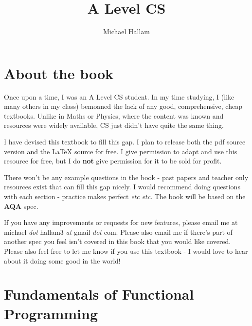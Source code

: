 \documentclass{article}
\title{A Level CS}
\author{Michael Hallam}
\begin{document}
	\maketitle
	\newpage

	\section{About the book}
	Once upon a time, I was an A Level CS student. In my time studying, I (like many others in my class) bemoaned the lack of any good, comprehensive, cheap textbooks. Unlike in Maths or Physics, where the content was known and resources were widely available, CS just didn't have quite the same thing.

	I have devised this textbook to fill this gap. I plan to release both the pdf source version and the \LaTeX{} source for free. I give permission to adapt and use this resource for free, but I do \textbf{not} give permission for it to be sold for profit.

	There won't be any example questions in the book - past papers and teacher only resources exist that can fill this gap nicely. I would recommend doing questions with each section - practice makes perfect \textit{etc etc}. The book will be based on the \textbf{AQA} spec.
	
	If you have any improvements or requests for new features, please email me at michael \textit{dot} hallam3 \textit{at} gmail \textit{dot} com. Please also email me if there's part of another spec you feel isn't covered in this book that you would like covered. Please also feel free to let me know if you use this textbook - I would love to hear about it doing some good in the world!

	\newpage

	\tableofcontents


	\section{Fundamentals of Functional Programming}
	
\end{document}
